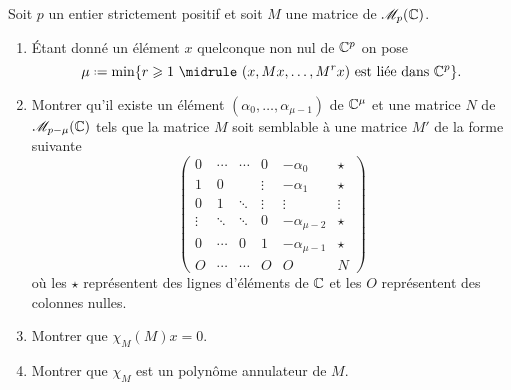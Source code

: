 \begin{exercice}
    Soit $p$ un entier strictement positif et soit $M$ une matrice de $\mathscr{M}_p(\mathbb{C})$.
    \begin{enumerate}
        \item Étant donné un élément $x$ quelconque non nul de $\mathbb{C}^p$ on pose
        $$\mu \defeq \min \{ r \geqslant 1\ \midrule \ (x, Mx, \dots, M^r x) \text{ est liée dans } \C^p\}.$$
        \item Montrer qu'il existe un élément $(\alpha_0, \dots, \alpha_{\mu-1})$ de $\mathbb{C}^{\mu}$ et une matrice $N$ de $\mathscr{M}_{p-\mu}(\mathbb{C})$ tels que la matrice $M$ soit semblable à une matrice $M'$ de la forme suivante
        $$
        \begin{pmatrix}
        0 & \cdots & \cdots & 0 & -\alpha_0 & \star \\
        1 & 0 & & \vdots & -\alpha_1 & \star \\
        0 & 1 & \ddots & \vdots & \vdots & \vdots \\
        \vdots & \ddots & \ddots & 0 & -\alpha_{\mu-2} & \star \\
        0 & \cdots & 0 & 1 & -\alpha_{\mu-1} & \star \\
        O & \cdots & \cdots & O & O & N
        \end{pmatrix}
        $$
        où les $\star$ représentent des lignes d'éléments de $\mathbb{C}$ et les $O$ représentent des colonnes nulles. 
        \item Montrer que $\chi_M(M)x = 0$.
        \item Montrer que $\chi_M$ est un polynôme annulateur de $M$.
    \end{enumerate}
\end{exercice}

\begin{preuve}
\end{preuve}
